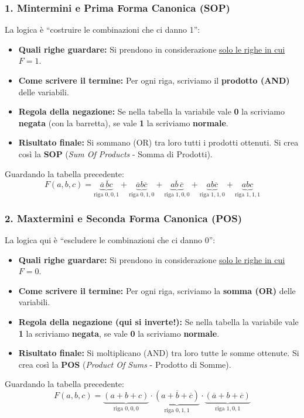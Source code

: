 \documentclass[11pt,a4paper]{report}
\begin{document}
\subsubsection*{1. Mintermini e Prima Forma Canonica (SOP)}
La logica è ``costruire le combinazioni che ci danno 1'':
\begin{itemize}
    \item \textbf{Quali righe guardare:} Si prendono in considerazione \underline{solo le righe in cui $F = 1$}.
    \item \textbf{Come scrivere il termine:} Per ogni riga, scriviamo il \textbf{prodotto (AND)} delle variabili.
    \item \textbf{Regola della negazione:} Se nella tabella la variabile vale \textbf{0} la scriviamo \textbf{negata} (con la barretta), se vale \textbf{1} la scriviamo \textbf{normale}.
    \item \textbf{Risultato finale:} Si sommano (OR) tra loro tutti i prodotti ottenuti. Si crea così la \textbf{SOP} (\emph{Sum Of Products} - Somma di Prodotti).
\end{itemize}
Guardando la tabella precedente:
\[
F(a,b,c) = \underbrace{\overline{a}\,\overline{b}c}_{\text{riga } 0,0,1} + \underbrace{\overline{a}b\overline{c}}_{\text{riga } 0,1,0} + \underbrace{a\overline{b}\,\overline{c}}_{\text{riga } 1,0,0} + \underbrace{ab\overline{c}}_{\text{riga } 1,1,0} + \underbrace{abc}_{\text{riga } 1,1,1}
\]

\subsubsection*{2. Maxtermini e Seconda Forma Canonica (POS)}
La logica qui è ``escludere le combinazioni che ci danno 0'':
\begin{itemize}
    \item \textbf{Quali righe guardare:} Si prendono in considerazione \underline{solo le righe in cui $F = 0$}.
    \item \textbf{Come scrivere il termine:} Per ogni riga, scriviamo la \textbf{somma (OR)} delle variabili.
    \item \textbf{Regola della negazione (qui si inverte!):} Se nella tabella la variabile vale \textbf{1} la scriviamo \textbf{negata}, se vale \textbf{0} la scriviamo \textbf{normale}.
    \item \textbf{Risultato finale:} Si moltiplicano (AND) tra loro tutte le somme ottenute. Si crea così la \textbf{POS} (\emph{Product Of Sums} - Prodotto di Somme).
\end{itemize}
Guardando la tabella precedente:
\[
F(a,b,c) = \underbrace{(a+b+c)}_{\text{riga } 0,0,0} \cdot \underbrace{(a+\overline{b}+\overline{c})}_{\text{riga } 0,1,1} \cdot \underbrace{(\overline{a}+b+\overline{c})}_{\text{riga } 1,0,1}
\]
\end{document}
